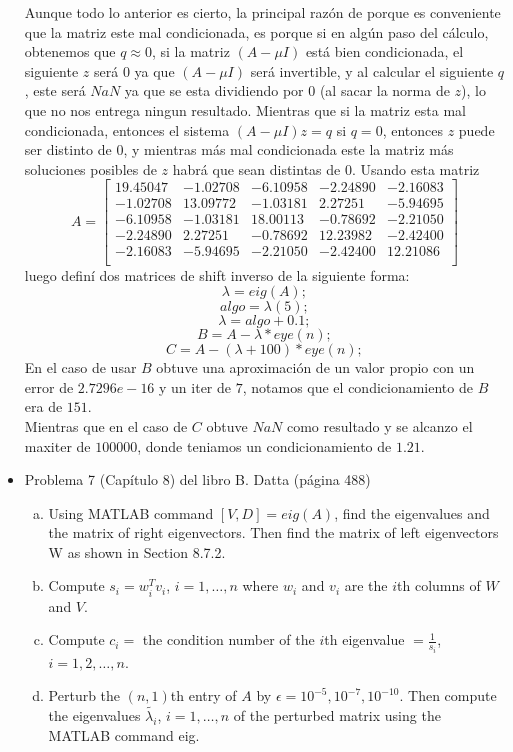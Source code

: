 \documentclass{article}
\begin{document}
\begin{itemize}
Aunque todo lo anterior es cierto, la principal razón de porque es conveniente que la matriz este mal condicionada, es porque si en algún paso del cálculo, obtenemos que $q\approx 0$, si la matriz $(A-\mu I)$ está bien condicionada, el siguiente $z$ será $0$ ya que $(A-\mu I)$ será invertible, y al calcular el siguiente $q$, este será $NaN$ ya que se esta dividiendo por $0$ (al sacar la norma de $z$), lo que no nos entrega ningun resultado. Mientras que si la matriz esta mal condicionada, entonces el sistema $(A-\mu I)z = q$ si $q = 0$, entonces $z$ puede ser distinto de $0$, y mientras más mal condicionada este la matriz más soluciones posibles de $z$ habrá que sean distintas de $0$.
Usando esta matriz
\[ A = 
\begin{bmatrix}
   19.45047  & -1.02708 &  -6.10958 &  -2.24890  & -2.16083\\
   -1.02708  & 13.09772  & -1.03181  &  2.27251  & -5.94695\\
   -6.10958 &  -1.03181  & 18.00113  & -0.78692  & -2.21050\\
   -2.24890  &  2.27251  & -0.78692  & 12.23982  & -2.42400\\
   -2.16083  & -5.94695  & -2.21050  & -2.42400  & 12.21086\\
\end{bmatrix}\]
luego definí dos matrices de shift inverso de la siguiente forma:
$$\lambda = eig(A);$$
$$algo = \lambda(5);$$
$$\lambda = algo + 0.1;$$
$$B = A - \lambda * eye(n);$$  
$$C = A - (\lambda + 100) *eye(n);$$
En el caso de usar $B$ obtuve una aproximación de un valor propio con un error de $2.7296e-16$ y un iter de $7$, notamos que el condicionamiento de $B$ era de $151$.\\ Mientras que en el caso de $C$ obtuve $NaN$ como resultado y se alcanzo el maxiter de $100000$, donde teniamos un condicionamiento de $1.21$.
\item Problema 7 (Capítulo 8) del libro B. Datta (página 488)
\begin{enumerate}[(a)]
\item Using MATLAB command $[V,D] = eig(A)$, find the eigenvalues and the matrix of right eigenvectors. Then find the matrix of left eigenvectors W as shown in Section 8.7.2.
\item Compute $s_{i} = w^{T}_{i}v_{i}$, $i = 1, \ldots, n$ where $w_i$ and $v_i$ are the $i$th columns of $W$ and $V$.
\item Compute $c_{i} = $ the condition number of the $i$th eigenvalue $= \frac{1}{s_{i}}$, $i = 1,2,\ldots, n$.
\item Perturb the $(n,1)$th entry of $A$ by $\epsilon = 10^{-5}, 10^{-7}, 10^{-10}$. Then compute the eigenvalues $\tilde{\lambda_i}$, $i = 1, \ldots, n$ of the perturbed matrix using the MATLAB command eig.

\end{enumerate}
\end{itemize}
\end{document}

